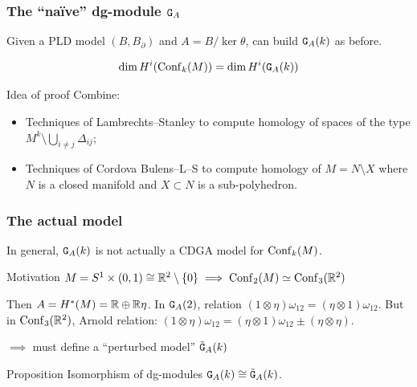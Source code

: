 \documentclass{beamer}
\begin{document}
\begin{frame}
  \frametitle{The ``naïve'' dg-module $\mathtt{G}_{A}$}
  Given a PLD model $(B, B_{\partial})$ and $A = B / \ker \theta$, can build \alert<1>{$\mathtt{G}_{A}(k)$} as before.

  \pause
  \begin{theorem}
    \[ \dim H^{i}(\operatorname{Conf}_{k}(M)) = \dim H^{i}(\mathtt{G}_{A}(k)) \]
  \end{theorem}

  \pause
  \begin{block}{Idea of proof}
    Combine:
    \begin{itemize}
    \item Techniques of Lambrechts--Stanley to compute homology of spaces of the type $M^{k} \setminus \bigcup_{i \neq j} \Delta_{ij}$;
    \item Techniques of Cordova Bulens--L--S to compute homology of $M = N \setminus X$ where $N$ is a closed manifold and $X \subset N$ is a sub-polyhedron.
    \end{itemize}
  \end{block}
\end{frame}

\begin{frame}
  \frametitle{The actual model}
  In general, $\mathtt{G}_{A}(k)$ is not actually a CDGA model for $\operatorname{Conf}_{k}(M)$.

  \pause
  \begin{block}{Motivation}
    $M = S^{1} \times (0,1) \cong \mathbb{R}^{2} \setminus \{ 0 \} \implies \operatorname{Conf}_{2}(M) \simeq \operatorname{Conf}_{3}(\mathbb{R}^{2})$

    \pause
    Then $A = H^{*}(M) = \mathbb{R} \oplus \mathbb{R} \eta$.
    In $\mathtt{G}_{A}(2)$, relation $(1 \otimes \eta) \omega_{12} = (\eta \otimes 1) \omega_{12}$.
    \pause
    But in $\operatorname{Conf}_{3}(\mathbb{R}^{2})$, Arnold relation: $(1 \otimes \eta) \omega_{12} = (\eta \otimes 1) \omega_{12} \pm (\eta \otimes \eta)$.
  \end{block}

  \pause
  $\implies$ must define a ``perturbed model'' $\tilde{\mathtt{G}}_{A}(k)$

  \begin{block}{Proposition}
    Isomorphism of dg-modules $\mathtt{G}_{A}(k) \cong \tilde{\mathtt{G}}_{A}(k)$.
  \end{block}
\end{frame}
\end{document}
